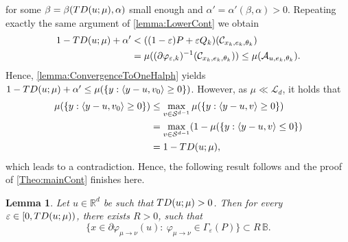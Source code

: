 \documentclass[11pt]{article}
\newcommand{\R}{\mathbb{R}}
\newcommand{\eps}{\varepsilon}
\theoremstyle{plain}
\newtheorem{lemma}[sectioncount]{Lemma}
\theoremstyle{definition}
\begin{document}
for some $\beta=\beta({\rm TD}(u;\mu),\alpha) $ small enough and $\alpha'=\alpha'(\beta, \alpha)>0$.
Repeating exactly the same argument of \autoref{lemma:LowerCont} we obtain 
\begin{align*}
     1-{\rm TD}(u;\mu)+\alpha'&<((1-\eps)P+ \eps Q_{k})(\mathcal{C}_{x_k,e_k,\theta_k})\\
     &=\mu((\partial\varphi_{\eps,k})^{-1}(\mathcal{C}_{x_k,e_k,\theta_k})) \leq \mu(\mathcal{A}_{u,e_k,\theta_k}).
\end{align*}
Hence, \autoref{lemma:ConvergenceToOneHalph} yields  $ 1-{\rm TD}(u;\mu)+\alpha' \leq \mu(\{ y: 
      \langle  y-u, v_0\rangle\geq 
0  \} ) $. However, as $\mu\ll \mathcal{L}_d$, it holds that
\begin{align*}
 \mu(\{ y: 
      \langle  y-u, v_0\rangle\geq 
0  \} )  &\leq \max_{v\in \mathcal{S}^{d-1}}\mu(\{ y: 
      \langle  y-u, v\rangle\geq 
0  \} )\\
&=\max_{v\in \mathcal{S}^{d-1}}(1-\mu(\{ y: 
      \langle  y-u, v\rangle\leq  
0  \} )\\
&=1-{\rm TD}(u;\mu),
\end{align*}
which leads to a contradiction. Hence, the following result  follows and the proof of \autoref{Theo:mainCont} finishes here. 
\begin{lemma}
    \label{lemma:LowerCont2}
    Let $u\in \R^d$ be such that ${\rm TD}(u;\mu)>0$. Then for every $\eps\in [0,{\rm TD}(u;\mu))$, there exists $R>0$, such that 
    $$ \{ x\in \partial \varphi_{\mu\to \nu}(u):\ \varphi_{\mu\to \nu} \in \Gamma_\eps(P)\}\subset R\,\mathbb{B}.
 $$
\end{lemma}
\end{document}
